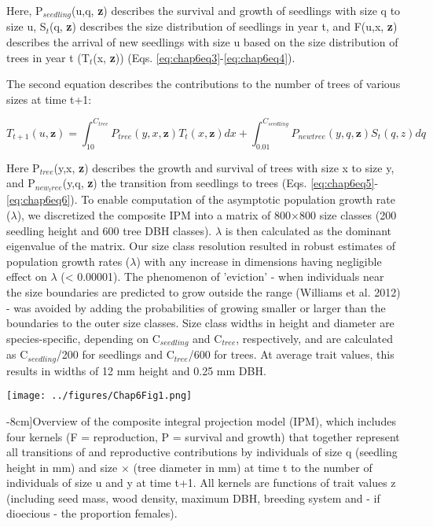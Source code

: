 \documentclass[b5paper,justified]{tufte-book} %
\begin{document}
\begin{fullwidth}
Here, P$_{seedling}$(u,q, \textbf{z}) describes the survival and growth of seedlings with size q to size u, S$_t$(q, \textbf{z}) describes the size distribution of seedlings in year t, and F(u,x, \textbf{z}) describes the arrival of new seedlings with size u based on the size distribution of trees in year t (T$_t$(x, \textbf{z})) (Eqs. \ref{eq:chap6eq3}-\ref{eq:chap6eq4}).

The second equation describes the contributions to the number of trees of various sizes at time t+1:	

\begin{equation}
T_{t+1}(u, \textbf{z}) = \int_{10}^{C_{tree}} P_{tree}(y,x,\textbf{z})T_t(x,\textbf{z})dx +
\int_{0.01}^{C_{seedling}} P_{new tree}(y,q,\textbf{z})S_t(q,z) dq
\label{eq:chap6eq2} 
\end{equation}

Here P$_{tree}$(y,x, \textbf{z}) describes the growth and survival of trees with size x to size y, and P$_{new_tree}$(y,q, \textbf{z}) the transition from seedlings to trees (Eqs. \ref{eq:chap6eq5}-\ref{eq:chap6eq6}).
	To enable computation of the asymptotic population growth rate ($\lambda$), we discretized the composite IPM into a matrix of 800$\times$800 size classes (200 seedling height and 600 tree DBH classes). $\lambda$ is then calculated as the dominant eigenvalue of the matrix. Our size class resolution resulted in robust estimates of population growth rates ($\lambda$) with any increase in dimensions having negligible effect on $\lambda$ (< 0.00001). The phenomenon of 'eviction' - when individuals near the size boundaries are predicted to grow outside the range (Williams et al. 2012) -  was avoided by adding the probabilities of growing smaller or larger than the boundaries to the outer size classes. Size class widths in height and diameter are species-specific, depending on C$_{seedling}$ and C$_{tree}$, respectively, and are calculated as C$_{seedling}$/200 for seedlings and C$_{tree}$/600 for trees. At average trait values, this results in widths of 12 mm height and 0.25 mm DBH.


\begin{figure*}
\texttt{[image: ../figures/Chap6Fig1.png]}
\caption[The proportion of interspecific variation in various demographic rates explained by the four functional traits][-8cm]{Overview of the composite integral projection model (IPM), which includes four kernels (F = reproduction, P = survival and growth) that together represent all transitions of and reproductive contributions by individuals of size q (seedling height in mm) and size $\times$ (tree diameter in mm) at time t to the number of individuals of size u and y at time t+1. All kernels are functions of trait values z (including seed mass, wood density, maximum DBH, breeding system and - if dioecious - the proportion females).}\label{fig:chap6fig1}
\end{figure*}



\end{fullwidth}
\end{document}

